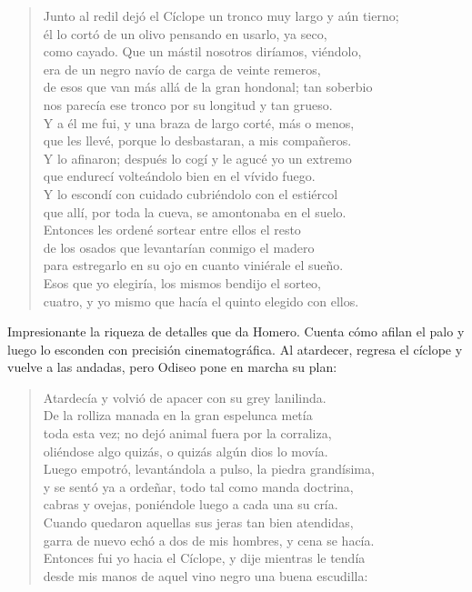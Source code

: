 \documentclass[11pt,a4paper]{article}
\begin{document}
\begin{verse}
Junto al redil dejó el Cíclope un tronco muy largo y aún tierno;\\
él lo cortó de un olivo pensando en usarlo, ya seco,\\
como cayado. Que un mástil nosotros diríamos, viéndolo,\\
era de un negro navío de carga de veinte remeros,\\
de esos que van más allá de la gran hondonal; tan soberbio\\
nos parecía ese tronco por su longitud y tan grueso.\\
Y a él me fui, y una braza de largo corté, más o menos,\\
que les llevé, porque lo desbastaran, a mis compañeros.\\
Y lo afinaron; después lo cogí y le agucé yo un extremo\\
que endurecí volteándolo bien en el vívido fuego.\\
Y lo escondí con cuidado cubriéndolo con el estiércol\\
que allí, por toda la cueva, se amontonaba en el suelo.\\
Entonces les ordené sortear entre ellos el resto\\
de los osados que levantarían conmigo el madero\\
para estregarlo en su ojo en cuanto viniérale el sueño.\\
Esos que yo elegiría, los mismos bendijo el sorteo,\\
cuatro, y yo mismo que hacía el quinto elegido con ellos.
\end{verse}

Impresionante la riqueza de detalles que da Homero. Cuenta cómo afilan el palo y luego lo esconden con precisión cinematográfica. Al atardecer, regresa el cíclope y vuelve a las andadas, pero Odiseo pone en marcha su plan:

\begin{verse}
Atardecía y volvió de apacer con su grey lanilinda.\\
De la rolliza manada en la gran espelunca metía\\
toda esta vez; no dejó animal fuera por la corraliza,\\
oliéndose algo quizás, o quizás algún dios lo movía.\\
Luego empotró, levantándola a pulso, la piedra grandísima,\\
y se sentó ya a ordeñar, todo tal como manda doctrina,\\
cabras y ovejas, poniéndole luego a cada una su cría.\\
Cuando quedaron aquellas sus jeras tan bien atendidas,\\
garra de nuevo echó a dos de mis hombres, y cena se hacía.\\
Entonces fui yo hacia el Cíclope, y dije mientras le tendía\\
desde mis manos de aquel vino negro una buena escudilla:
\end{verse}
\end{document}
